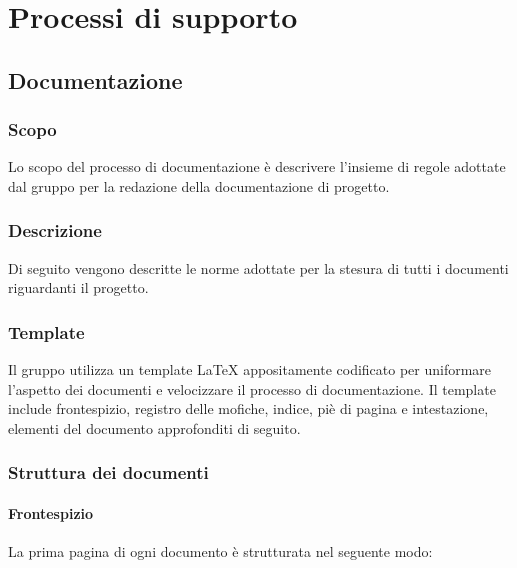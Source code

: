 \documentclass[../NormediProgetto.tex]{subfiles}
\begin{document}
\chapter{Processi di supporto}

\section{Documentazione}

\subsection{Scopo} 

Lo scopo del processo di documentazione è descrivere l'insieme di regole adottate dal gruppo per la redazione della documentazione di progetto. 
	
\subsection{Descrizione}

Di seguito vengono descritte le norme adottate per la stesura di tutti i documenti riguardanti il progetto.

\subsection{Template}

Il gruppo utilizza un template \LaTeX{} appositamente codificato per uniformare l'aspetto dei documenti e velocizzare il processo di documentazione. Il template include frontespizio, registro delle mofiche, indice, piè di pagina e intestazione, elementi del documento approfonditi di seguito. 

\subsection{Struttura dei documenti}

\subsubsection{Frontespizio}

La prima pagina di ogni documento è strutturata nel seguente modo:
\end{document}
